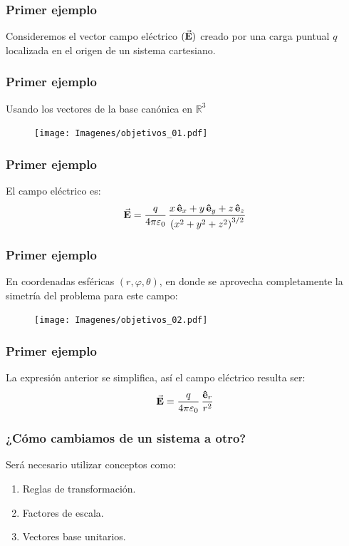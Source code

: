 \documentclass[12pt]{beamer}
\begin{document}
\begin{frame}
\frametitle{Primer ejemplo}
Consideremos el vector campo eléctrico $(\va{E})$ creado por una carga puntual $q$ localizada en el origen de un sistema cartesiano.
\end{frame}
\begin{frame}
\frametitle{Primer ejemplo}
Usando los vectores de la base canónica en $\mathbb{R}^{3}$
\begin{figure}[H]
  \centering
  \texttt{[image: Imagenes/objetivos\_01.pdf]}
\end{figure}
\end{frame}
\begin{frame}
\frametitle{Primer ejemplo}
El campo eléctrico es:
\pause
\begin{align*}
\va{E} = \dfrac{q}{4 \pi \varepsilon_{0}} \, \dfrac{x \, \vu{e}_{x} + y \, \vu{e}_{y} + z \, \vu{e}_{z}}{\left( x^{2} + y^{2} + z^{2} \right)^{3/2}}
\end{align*}
\end{frame}
\begin{frame}
\frametitle{Primer ejemplo}
En coordenadas esféricas $(r, \varphi, \theta)$, en donde se aprovecha completamente la simetría del problema para este campo:
\begin{figure}[H]
  \centering
  \texttt{[image: Imagenes/objetivos\_02.pdf]}
\end{figure}
\end{frame}
\begin{frame}
\frametitle{Primer ejemplo}
La expresión anterior se simplifica, \pause así el campo eléctrico resulta ser:
\begin{align*}
\va{\vb{E}} = \dfrac{q}{4 \pi \varepsilon_{0}} \, \dfrac{\vu{e}_{r}}{r^{2}}
\end{align*}
\end{frame}
\begin{frame}
\frametitle{¿Cómo cambiamos de un sistema a otro?}
Será necesario utilizar conceptos como:
\pause
{}
\begin{enumerate}[<+->]
\item Reglas de transformación.
\item Factores de escala.
\item Vectores base unitarios.
\end{enumerate}
\end{frame}
\end{document}
